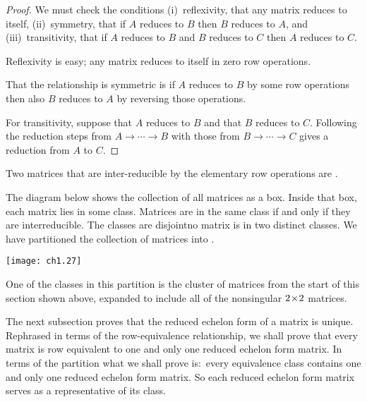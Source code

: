 \begin{proof}
We must check the conditions
(i)~reflexivity, that any matrix reduces to itself,
(ii)~symmetry, that if \( A \) reduces to \( B \) then
   \( B \) reduces to \( A \),
and (iii)~transitivity, that if \( A \) reduces to \( B \) and
      \( B \) reduces to \( C \) then \( A \) reduces to
      \( C \).

Reflexivity is easy; any  matrix reduces to itself in zero row operations.

That the relationship is symmetric is \Dash if
\( A \) reduces to \( B \) by some row operations
then also \( B \) reduces to \( A \) by reversing those operations.

For transitivity, suppose that \( A \) reduces to \( B \) and
that \( B \) reduces to \( C \).
Following the reduction steps from $A \rightarrow\cdots\rightarrow B$
with those from  $B \rightarrow\cdots\rightarrow C$ 
gives a reduction from \( A \) to \( C \).
\end{proof}

\begin{definition}
Two matrices that are inter-reducible by the elementary row operations
are .%
\end{definition}

The diagram below shows the collection of all matrices as a box.
Inside that box, each matrix lies in some class.
Matrices are in the same class if and only if they are interreducible.
The classes are disjoint\Dash no matrix is in two distinct classes.
We have partitioned the collection of matrices into 
.

\begin{center}
  \texttt{[image: ch1.27]}
\end{center}
\noindent One of the classes in this partition is the
cluster of matrices from the start of this section shown above,
expanded to include all of the nonsingular $2 \! \times \! 2$ matrices. 

The next subsection proves that the reduced echelon form of a matrix is 
unique.
Rephrased in terms of the row-equivalence relationship, 
we shall prove that every matrix is 
row equivalent to one and only one reduced echelon form matrix.
In terms of the partition what we shall prove is:~every
equivalence class contains one and only one reduced echelon form matrix.
So each reduced echelon form matrix serves as a representative of its 
class.

